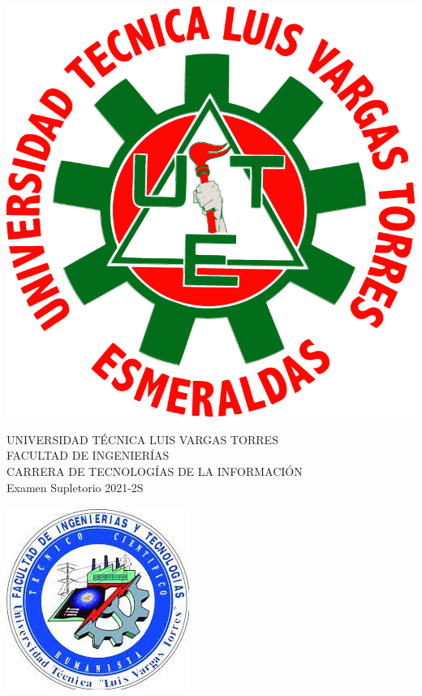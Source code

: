 \documentclass[12pt]{exam}
\begin{document}
\thispagestyle{headandfoot}


\begin{minipage}[H]{0.10\linewidth}
  \flushleft
 \includegraphics[scale=0.12]{images/logoutlvte.png} 
\end{minipage}
\begin{minipage}[H]{0.70\linewidth}
  \begin{center}
    UNIVERSIDAD TÉCNICA LUIS VARGAS TORRES\\  FACULTAD DE INGENIERÍAS\\
    CARRERA DE TECNOLOGÍAS DE LA INFORMACIÓN \\ Examen Supletorio 2021-2S 
  \end{center}
\end{minipage}
\begin{minipage}[H]{0.10\linewidth}
    \flushleft
    \includegraphics[scale=0.3]{images/logofit}
\end{minipage}
\end{document}
